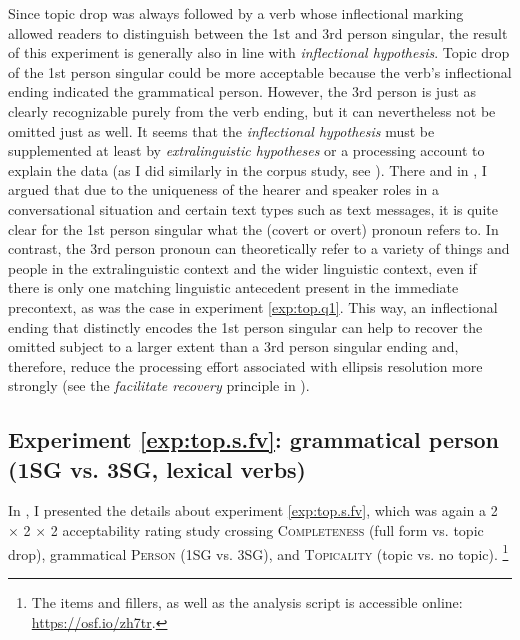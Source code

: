 Since topic drop was always followed by a verb whose inflectional marking allowed readers to distinguish between the 1st and 3rd person singular, the result of this experiment is generally also in line with  \textit{inflectional hypothesis}. 
Topic drop of the 1st person singular could be more acceptable because the verb's inflectional ending indicated the grammatical person. 
However, the 3rd person is just as clearly recognizable purely from the verb ending, but it can nevertheless not be omitted just as well.
It seems that the \textit{inflectional hypothesis}  must be supplemented at least by \textit{extralinguistic hypotheses} or a processing account to explain the data (as I did similarly in the corpus study, see ).
There and in , I argued that due to the uniqueness of the hearer and speaker roles in a conversational situation and certain text types such as text messages, it is quite clear for the 1st person singular what the (covert or overt) pronoun refers to.
In contrast, the 3rd person pronoun can theoretically refer to a variety of things and people in the extralinguistic context and the wider linguistic context, even if there is only one matching linguistic antecedent  present in the immediate precontext, as was the case in experiment \ref*{exp:top.q1}.
This way, an inflectional ending  that distinctly encodes the 1st person singular can help to recover  the omitted subject to a larger extent than a 3rd person singular ending and, therefore, reduce the processing effort  associated with ellipsis resolution more strongly (see the \textit{facilitate recovery} principle  in ). 

\subsection{Experiment \ref*{exp:top.s.fv}: grammatical person (1SG vs. 3SG, lexical verbs)}
\label{sec:exp.top.s.fv.person}
In , I presented the details about experiment \ref*{exp:top.s.fv}, which was again a 2 $\times$ 2 $\times$ 2 acceptability rating study crossing \textsc{Completeness} (full form vs. topic drop), grammatical \textsc{Person} (1SG vs. 3SG), and \textsc{Topicality} (topic vs. no topic).%
\footnote{The items and fillers, as well as the analysis script is accessible online: \url{https://osf.io/zh7tr}.}

